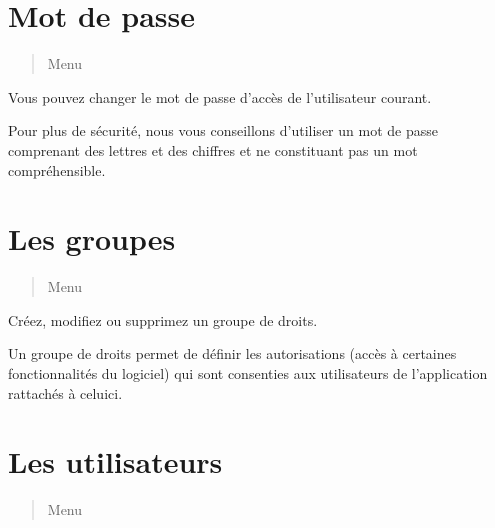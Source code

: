 \documentclass[a4paper,10pt,oneside,french]{sphinxmanual}
\begin{document}
\sphinxstepscope


\section{Mot de passe}
\label{\detokenize{CORE/password:mot-de-passe}}\label{\detokenize{CORE/password::doc}}\begin{quote}

\sphinxAtStartPar
Menu 
\end{quote}

\sphinxAtStartPar
Vous pouvez changer le mot de passe d’accès de l’utilisateur courant.

\noindent{}

\sphinxAtStartPar
Pour plus de sécurité, nous vous conseillons d’utiliser un mot de passe comprenant des lettres et des chiffres et ne constituant pas un mot compréhensible.

\sphinxstepscope


\section{Les groupes}
\label{\detokenize{CORE/groups:les-groupes}}\label{\detokenize{CORE/groups::doc}}\begin{quote}

\sphinxAtStartPar
Menu 
\end{quote}

\sphinxAtStartPar
Créez, modifiez ou supprimez un groupe de droits.

\noindent{}

\sphinxAtStartPar
Un groupe de droits permet de définir les autorisations (accès à certaines fonctionnalités du logiciel) qui sont consenties aux utilisateurs de l’application rattachés à celui\sphinxhyphen{}ci.

\noindent{}

\sphinxstepscope


\section{Les utilisateurs}
\label{\detokenize{CORE/users:les-utilisateurs}}\label{\detokenize{CORE/users::doc}}\begin{quote}

\sphinxAtStartPar
Menu 
\end{quote}
\end{document}
